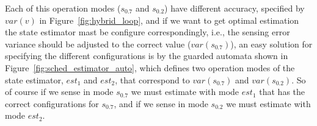 \documentclass[ twoside, 12pt ]{article}
\begin{document}
{Each of this operation modes ($s_{0.7}$ and $s_{0.2}$) have different accuracy, specified by $var(v)$ in Figure~\ref{fig:hybrid_loop}, and if we want to get optimal estimation the state estimator mast be configure correspondingly, i.e., the sensing error variance should be adjusted to the correct value ($var(s_{0.7})$), an easy solution for specifying the different configurations is by the guarded automata shown in Figure~\ref{fig:sched_estimator_auto}, which defines two operation modes of the state estimator, $est_1$ and $est_2$, that correspond to $var(s_{0.7})$ and $var(s_{0.2})$. So of course if we sense in mode $s_{0.7}$ we must estimate with mode $est_1$ that has the correct configurations for $s_{0.7}$, and if we sense in mode $s_{0.2}$ we must estimate with mode $est_2$.    
}




\begin{titlepage}
    \hspace{3cm}
\end{titlepage}

%
\end{document}
